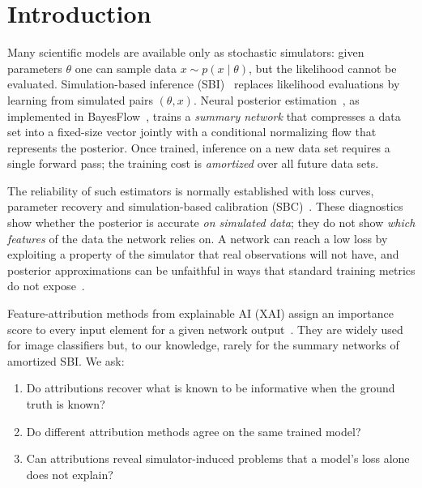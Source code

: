 \documentclass[conference]{IEEEtran}
\begin{document}
\section{Introduction}

Many scientific models are available only as stochastic simulators: given parameters $\theta$ one can sample
data $x\sim p(x\mid\theta)$, but the likelihood cannot be evaluated. Simulation-based inference
(SBI)~\cite{cranmer2020frontier} replaces likelihood evaluations by learning from simulated pairs
$(\theta,x)$. Neural posterior estimation~\cite{papamakarios2016fast,greenberg2019automatic}, as implemented in
BayesFlow~\cite{radev2020bayesflow,radev2023bayesflow}, trains a \emph{summary network} that compresses a data set
into a fixed-size vector jointly with a conditional normalizing flow that represents the posterior. Once
trained, inference on a new data set requires a single forward pass; the training cost is \emph{amortized}
over all future data sets.

The reliability of such estimators is normally established with loss curves, parameter recovery and
simulation-based calibration (SBC)~\cite{talts2018sbc}. These diagnostics show whether the posterior is
accurate \emph{on simulated data}; they do not show \emph{which features} of the data the network relies on. A
network can reach a low loss by exploiting a property of the simulator that real observations will not have,
and posterior approximations can be unfaithful in ways that standard training metrics do not expose~\cite{hermans2022trust}.

Feature-attribution methods from explainable AI (XAI) assign an importance score to every input element for a
given network output~\cite{simonyan2014deep,sundararajan2017axiomatic,zeiler2014visualizing,abnar2020quantifying}.
They are widely used for image classifiers but, to our knowledge, rarely for the summary networks of amortized SBI. We ask:

\begin{enumerate}[label=\textbf{Q\arabic*}]
  \item Do attributions recover what is known to be informative when the ground truth is known?
  \item Do different attribution methods agree on the same trained model?
  \item Can attributions reveal simulator-induced problems that a model's loss alone does not explain?
\end{enumerate}
\end{document}
